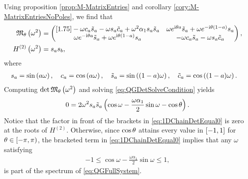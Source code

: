 Using proposition \ref{prop:M-MatrixEntries} and corollary \ref{cory:M-MatrixEntriesNoPoles}, we find that
\begin{align*}
	\mathfrak{M}_{\theta}\left( \omega^2 \right) &= 
	\begin{pmatrix}[1.75]
		-\omega c_a \tilde{s}_a - \omega s_a \tilde{c}_{a} + \omega^2\alpha_1 s_a \tilde{s}_a &
		\omega e^{\mathrm{i}\theta a} \tilde{s}_a + \omega e^{-\mathrm{i}\theta(1-a)} s_a \\
		\omega e^{-\mathrm{i}\theta a} \tilde{s}_a + \omega e^{\mathrm{i}\theta(1-a)} s_a &
		-\omega c_a \tilde{s}_a - \omega s_a \tilde{c}_a
	\end{pmatrix}, \\
	H^{(2)}\left( \omega^2 \right) &= s_a s_b, \\
\end{align*}
where
\begin{align*}
	s_a &= \sin\left( a\omega \right), \quad c_a = \cos\left( a\omega \right), 
	\quad \tilde{s}_a = \sin\left( (1-a)\omega \right), \quad \tilde{c}_a = \cos\left( (1-a)\omega \right).
\end{align*}
Computing $\det\mathfrak{M}_{\theta}\left( \omega^2 \right)$ and solving \eqref{eq:QGDetSolveCondition} yields
\begin{align} \label{eq:1DChainDetEqual0}
	0 = 2\omega^2 s_a \tilde{s}_a \left(  \cos\omega - \frac{\omega\alpha_1}{2}\sin\omega - \cos\theta  \right).
\end{align}
Notice that the factor in front of the brackets in \eqref{eq:1DChainDetEqual0} is zero at the roots of $H^{(2)}$.
Otherwise, since $\cos\theta$ attains every value in $\left[ -1,1 \right]$ for $\theta\in\left[-\pi,\pi\right)$, the bracketed term in \eqref{eq:1DChainDetEqual0} implies that any $\omega$ satisfying
\begin{align*}
	-1 \leq \cos\omega - \frac{\omega\alpha_1}{2}\sin\omega \leq 1,
\end{align*}
is part of the spectrum of \eqref{eq:QGFullSystem}.

